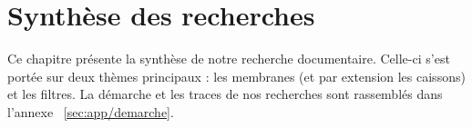 \chapter{Synthèse des recherches}

\label{Synthèse des recherches}

Ce chapitre présente la synthèse de notre recherche documentaire. Celle-ci s'est portée sur deux thèmes principaux : les membranes (et par extension les caissons) et les filtres. La démarche et les traces de nos recherches sont rassemblés dans l'annexe ~\ref{sec:app/demarche}.


